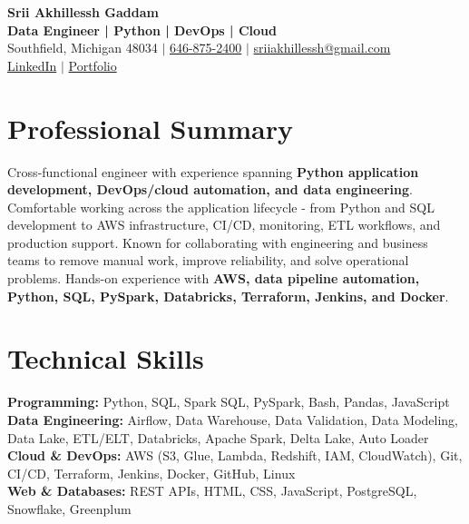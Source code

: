\documentclass[letterpaper,10pt]{article}
\begin{document}
\fontsize{9.35pt}{10.45pt}\selectfont

\begin{center}
    {\LARGE \textbf{Srii Akhillessh Gaddam}} \\[-1pt]
    \textbf{Data Engineer | Python | DevOps | Cloud} \\[2pt]
    Southfield, Michigan 48034 $|$
    \href{tel:6468752400}{646-875-2400} $|$
    \href{mailto:sriiakhillessh@gmail.com}{sriiakhillessh@gmail.com} \\[1pt]
    \href{https://www.linkedin.com/in/srii-akhiilessh-gaddam-b48668191/}{LinkedIn} $|$
    \href{https://sriiakhillesshg.github.io/portfolio/}{Portfolio}
\end{center}
\vspace{-8pt}

\section{Professional Summary}
\small{Cross-functional engineer with experience spanning \textbf{Python application development, DevOps/cloud automation, and data engineering}. Comfortable working across the application lifecycle - from Python and SQL development to AWS infrastructure, CI/CD, monitoring, ETL workflows, and production support. Known for collaborating with engineering and business teams to remove manual work, improve reliability, and solve operational problems. Hands-on experience with \textbf{AWS, data pipeline automation, Python, SQL, PySpark, Databricks, Terraform, Jenkins, and Docker}.}

\section{Technical Skills}
\small{
\textbf{Programming:} Python, SQL, Spark SQL, PySpark, Bash, Pandas, JavaScript \\
\textbf{Data Engineering:} Airflow, Data Warehouse, Data Validation, Data Modeling, Data Lake, ETL/ELT, Databricks, Apache Spark, Delta Lake, Auto Loader \\
\textbf{Cloud \& DevOps:} AWS (S3, Glue, Lambda, Redshift, IAM, CloudWatch), Git, CI/CD, Terraform, Jenkins, Docker, GitHub, Linux \\
\textbf{Web \& Databases:} REST APIs, HTML, CSS, JavaScript, PostgreSQL, Snowflake, Greenplum
}
\end{document}

